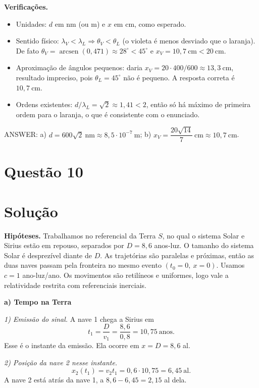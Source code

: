 \documentclass{article}%
\begin{document}
\medskip
\textbf{Verificações.}
\begin{itemize}
\item Unidades: $d$ em nm (ou m) e $x$ em cm, como esperado.
\item Sentido físico: $\lambda_V<\lambda_L \Rightarrow \theta_V<\theta_L$ (o violeta é menos desviado que o laranja). De fato $\theta_V = \operatorname{arcsen}(0{,}471)\approx 28^\circ < 45^\circ$ e $x_V = 10{,}7\ \mathrm{cm} < 20\ \mathrm{cm}$.
\item Aproximação de ângulos pequenos: daria $x_V = 20\cdot 400/600 \approx 13{,}3\ \mathrm{cm}$, resultado impreciso, pois $\theta_L = 45^\circ$ não é pequeno. A resposta correta é $10{,}7\ \mathrm{cm}$.
\item Ordens existentes: $d/\lambda_L = \sqrt2 \approx 1{,}41 < 2$, então só há máximo de primeira ordem para o laranja, o que é consistente com o enunciado.
\end{itemize}

\medskip
ANSWER: a) $d = 600\sqrt2\ \mathrm{nm}\approx 8{,}5\cdot 10^{-7}\ \mathrm{m}$; b) $x_V = \dfrac{20\sqrt{14}}{7}\ \mathrm{cm}\approx 10{,}7\ \mathrm{cm}$.%
\newpage%
\section*{Questão 10}

\section*{Solução}

\textbf{Hipóteses.} Trabalhamos no referencial da Terra $S$, no qual o sistema Solar e Sirius estão em repouso, separados por $D = 8{,}6$ anos-luz. O tamanho do sistema Solar é desprezível diante de $D$. As trajetórias são paralelas e próximas, então as duas naves passam pela fronteira no mesmo evento $(t_0=0,\ x=0)$. Usamos $c = 1$ ano-luz/ano. Os movimentos são retilíneos e uniformes, logo vale a relatividade restrita com referenciais inerciais.

\textbf{a) Tempo na Terra}

\emph{1) Emissão do sinal.} A nave 1 chega a Sirius em
\[
t_1=\frac{D}{v_1}=\frac{8{,}6}{0{,}8}=10{,}75\ \text{anos}.
\]
Esse é o instante da emissão. Ela ocorre em $x=D=8{,}6$ al.

\emph{2) Posição da nave 2 nesse instante.}
\[
x_2(t_1)=v_2t_1=0{,}6\cdot 10{,}75=6{,}45\ \text{al}.
\]
A nave 2 está atrás da nave 1, a $8{,}6-6{,}45=2{,}15$ al dela.
\end{document}
